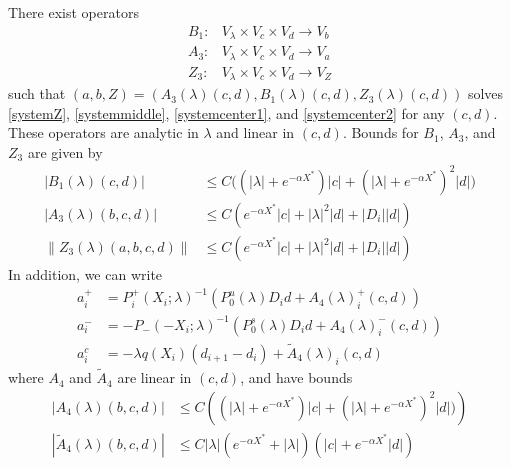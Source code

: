 \documentclass[thesis.tex]{subfiles}
\begin{document}
\begin{lemma}\label{Zinv2}
There exist operators
\begin{align*}
B_1: &V_\lambda \times V_c \times V_d \rightarrow V_b \\
A_3: &V_\lambda \times V_c \times V_d \rightarrow V_a \\
Z_3: &V_\lambda \times V_c \times V_d \rightarrow V_Z
\end{align*}
such that $( a, b, Z ) = ( A_3(\lambda)(c, d), B_1(\lambda)(c, d), Z_3(\lambda)(c, d) )$ solves \eqref{systemZ}, \eqref{systemmiddle}, \eqref{systemcenter1}, and \eqref{systemcenter2} for any $(c, d)$. These operators are analytic in $\lambda$ and linear in $(c, d)$. Bounds for $B_1$, $A_3$, and $Z_3$ are given by
\begin{align}
|B_1(\lambda)(c, d)| &\leq C\Big( (|\lambda| + e^{-\alpha X^*})|c| + (|\lambda| + e^{-\alpha X^*})^2 |d| \Big) \label{B1bound} \\
|A_3(\lambda)(b, c, d)| &\leq C \left( e^{-\alpha X^*} |c| + |\lambda|^2 |d| + |D_i||d| \right) \label{A3bound} \\
\| Z_3(\lambda)(a,b,c,d) \| &\leq C\left( e^{-\alpha X^*} |c| + |\lambda|^2|d| + |D_i||d| \right) \label{Z3bound}
\end{align} 
In addition, we can write
\begin{align*}
a_i^+ &= P_i^+(X_i; \lambda)^{-1} \left( P_0^u(\lambda) D_i d + A_4(\lambda)_i^+(c, d) \right) \\
a_i^- &= -P_-(-X_i; \lambda)^{-1} \left( P_0^s(\lambda) D_i d + A_4(\lambda)_i^-(c, d) \right) \\
a_i^c &= -\lambda q(X_i)(d_{i+1} - d_i ) + \tilde{A}_4(\lambda)_i(c, d) 
\end{align*}
where $A_4$ and $\tilde{A}_4$ are linear in $(c, d)$, and have bounds
\begin{align}
|A_4(\lambda)(b, c, d)|
&\leq C \left( (|\lambda| + e^{-\alpha X^*})|c| + (|\lambda| + e^{-\alpha X^*})^2 |d| ) \right)  \label{A4bound} \\
|\tilde{A}_4(\lambda)(b, c, d)| &\leq C |\lambda| ( e^{-\alpha X^*} + |\lambda|) \left( |c| + e^{-\alpha X^*} |d| \right) \label{tildeA4bound}
\end{align}


\end{lemma}
\end{document}
